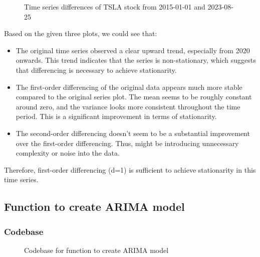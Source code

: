 \documentclass[11pt]{article}
\begin{document}
\begin{figure}[ht]
    \centering
    \caption{Time series differences of TSLA stock from 2015-01-01 and 2023-08-25}
    \label{fig:time_series_diff}
\end{figure}

Based on the given three plots, we could see that:
\begin{itemize}
    \item The original time series observed a clear upward trend, especially from 2020 onwards. This trend indicates that the series is non-stationary, which suggests that differencing is necessary to achieve stationarity.
    \item The first-order differencing of the original data appears much more stable compared to the original series plot. The mean seems to be roughly constant around zero, and the variance looks more consistent throughout the time period. This is a significant improvement in terms of stationarity.
    \item The second-order differencing doesn't seem to be a substantial improvement over the first-order differencing. Thus, might be introducing unnecessary complexity or noise into the data.
\end{itemize}

Therefore, first-order differencing (d=1) is sufficient to achieve stationarity in this time series.

\subsection{Function to create ARIMA model}

\subsubsection{Codebase}

\begin{figure}[ht]
    \centering
    \caption{Codebase for function to create ARIMA model}
    \label{fig:arima_model_code}
\end{figure}
\end{document}

